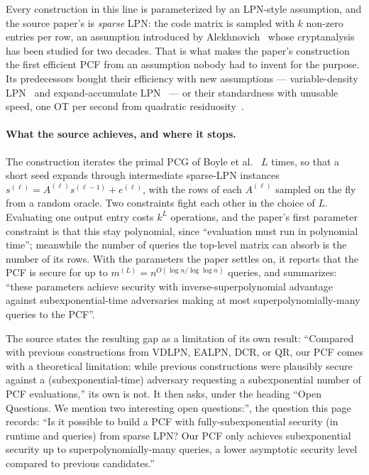 \documentclass{aicr-conjecture}
\begin{document}
Every construction in this line is parameterized by an LPN-style
assumption, and the source paper's is \emph{sparse} LPN\@: the code matrix
is sampled with $k$ non-zero entries per row, an assumption introduced
by Alekhnovich~\cite{Ale03} whose cryptanalysis has been studied for two
decades. That is what makes the paper's construction the first efficient
PCF from an assumption nobody had to invent for the purpose. Its
predecessors bought their efficiency with new assumptions --- variable-density
LPN~\cite{BCGIKS20,CD23} and expand-accumulate LPN~\cite{BCGIKRS22} ---
or their standardness with unusable speed, one OT per second from
quadratic residuosity~\cite{OSY21}.

\paragraph{What the source achieves, and where it stops.}
The construction iterates the primal PCG of Boyle et
al.~\cite{BCGI18} $L$ times, so that a short seed expands through
intermediate sparse-LPN instances
$s^{(\ell)} = A^{(\ell)} s^{(\ell-1)} + e^{(\ell)}$, with the rows of
each $A^{(\ell)}$ sampled on the fly from a random oracle. Two
constraints fight each other in the choice of $L$. Evaluating one output
entry costs $k^{L}$ operations, and the paper's first parameter
constraint is that this stay polynomial, since ``evaluation must run in
polynomial time''; meanwhile the number of queries the top-level matrix
can absorb is the number of its rows. With the parameters the paper
settles on, it reports that the PCF is secure for up to
$m^{(L)} = n^{O(\log n / \log\log n)}$ queries, and summarizes: ``these
parameters achieve security with inverse-superpolynomial advantage
against subexponential-time adversaries making at most
superpolynomially-many queries to the PCF''.

The source states the resulting gap as a limitation of its own result:
``Compared with previous constructions from VDLPN, EALPN, DCR, or QR,
our PCF comes with a theoretical limitation: while previous
constructions were plausibly secure against a (subexponential-time)
adversary requesting a subexponential number of PCF evaluations,'' its
own is not. It then asks, under the heading ``Open Questions. We mention
two interesting open questions:'', the question this page records:
``Is it possible to build a PCF with fully-subexponential security (in
runtime and queries) from sparse LPN\@? Our PCF only achieves
subexponential security up to superpolynomially-many queries, a lower
asymptotic security level compared to previous candidates.''
\end{document}
